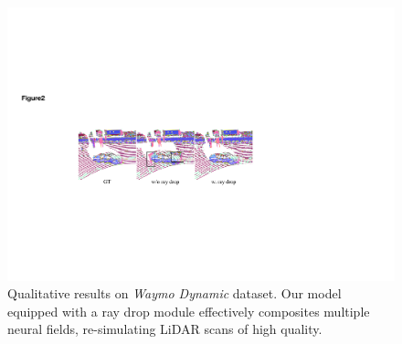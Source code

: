 \begin{figure}[t]
  \centering
   \includegraphics[width=0.8\columnwidth]{Figures/intersectiontest.pdf}
   \caption{
   Qualitative results on \textit{Waymo Dynamic} dataset. Our model equipped with a ray drop module effectively composites multiple neural fields, re-simulating LiDAR scans of high quality.
   }
    
   \label{fig:ablation_raydrop}
\end{figure}